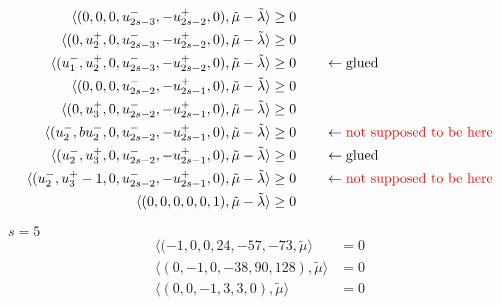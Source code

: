 \documentclass{amsart}
\numberwithin{theorem}{section}
\begin{document}
  \begin{align*}
    \langle (0,0,0,u_{2s-3}^-,-u_{2s-2}^+,0), \tilde\mu - \tilde\lambda\rangle &\ge 0\\ 
    \langle (0,u_2^+,0,u_{2s-3}^-,-u_{2s-2}^+,0), \tilde\mu - \tilde\lambda\rangle &\ge 0\\ 
    \langle (u_1^-,u_2^+,0,u_{2s-3}^-,-u_{2s-2}^+,0), \tilde\mu - \tilde\lambda\rangle &\ge 0 \qquad \leftarrow \text{glued}\\ 
    \langle (0,0,0,u_{2s-2}^-,-u_{2s-1}^+,0), \tilde\mu - \tilde\lambda\rangle &\ge 0\\ 
    \langle (0,u_3^+,0,u_{2s-2}^-,-u_{2s-1}^+,0), \tilde\mu - \tilde\lambda\rangle &\ge 0\\ 
    \langle (u_2^-,bu_2^-,0,u_{2s-2}^-,-u_{2s-1}^+,0), \tilde\mu - \tilde\lambda\rangle &\ge 0 \qquad \leftarrow \text{\color{red}not supposed to be here}\\
    \langle (u_2^-,u_3^+,0,u_{2s-2}^-,-u_{2s-1}^+,0), \tilde\mu - \tilde\lambda\rangle &\ge 0 \qquad \leftarrow \text{glued}\\ 
    \langle (u_2^-,u_3^+ - 1,0,u_{2s-2}^-,-u_{2s-1}^+,0), \tilde\mu - \tilde\lambda\rangle &\ge 0 \qquad \leftarrow \text{\color{red}not supposed to be here}\\ 
    \langle (0,0,0,0,0,1), \tilde\mu - \tilde\lambda\rangle &\ge 0\\ 
  \end{align*}

  $s=5$
  \begin{align*}
    \langle (-1,0,0,24, -57, -73, \tilde\mu \rangle &= 0\\
    \langle (0,-1,0, -38, 90, 128), \tilde\mu \rangle &= 0\\
    \langle (0,0,-1, 3, 3, 0), \tilde\mu \rangle &= 0
  \end{align*}
\end{document}
